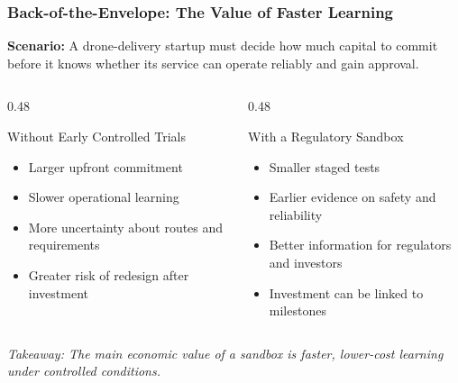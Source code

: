\documentclass{beamer}
\begin{document}
\begin{frame}[t, shrink=10]
  \frametitle{Back-of-the-Envelope: The Value of Faster Learning}
  \textbf{Scenario:} A drone-delivery startup must decide how much capital to commit before it knows whether its service can operate reliably and gain approval.
  \begin{columns}[T]
    \begin{column}{0.48\textwidth}
      \begin{block}{Without Early Controlled Trials}
      \begin{itemize}
        \item Larger upfront commitment
        \item Slower operational learning
        \item More uncertainty about routes and requirements
        \item Greater risk of redesign after investment
      \end{itemize}
      \end{block}
    \end{column}
    \begin{column}{0.48\textwidth}
      \begin{block}{With a Regulatory Sandbox}
      \begin{itemize}
        \item Smaller staged tests
        \item Earlier evidence on safety and reliability
        \item Better information for regulators and investors
        \item Investment can be linked to milestones
      \end{itemize}
      \end{block}
    \end{column}
  \end{columns}
  \vspace{0.3cm}
  \textit{Takeaway: The main economic value of a sandbox is faster, lower-cost learning under controlled conditions.}
\end{frame}
\end{document}
